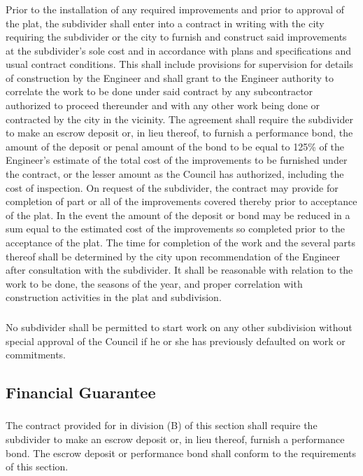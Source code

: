 \subsubsection{}
Prior to the installation of any required improvements and prior to approval of the plat, the subdivider shall enter into a contract in writing with the city requiring the subdivider or the city to furnish and construct said improvements at the subdivider’s sole cost and in accordance with plans and specifications and usual contract conditions. This shall include provisions for supervision for details of construction by the Engineer and shall grant to the Engineer authority to correlate the work to be done under said contract by any subcontractor authorized to proceed thereunder and with any other work being done or contracted by the city in the vicinity. The agreement shall require the subdivider to make an escrow deposit or, in lieu thereof, to furnish a performance bond, the amount of the deposit or penal amount of the bond to be equal to 125\% of the Engineer’s estimate of the total cost of the improvements to be furnished under the contract, or the lesser amount as the Council has authorized, including the cost of inspection. On request of the subdivider, the contract may provide for completion of part or all of the improvements covered thereby prior to acceptance of the plat. In the event the amount of the deposit or bond may be reduced in a sum equal to the estimated cost of the improvements so completed prior to the acceptance of the plat. The time for completion of the work and the several parts thereof shall be determined by the city upon recommendation of the Engineer after consultation with the subdivider. It shall be reasonable with relation to the work to be done, the seasons of the year, and proper correlation with construction activities in the plat and subdivision.
\subsubsection{}
No subdivider shall be permitted to start work on any other subdivision without special approval of the Council if he or she has previously defaulted on work or commitments.
\subsection{Financial Guarantee}
\subsubsection{}
The contract provided for in division (B) of this section shall require the subdivider to make an escrow deposit or, in lieu thereof, furnish a performance bond. The escrow deposit or performance bond shall conform to the requirements of this section.
